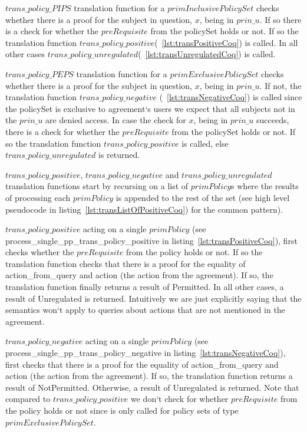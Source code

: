 $trans\_policy\_PIPS$ translation function for a $primInclusivePolicySet$ checks whether there is a proof for the subject in question, $x$, being in $prin\_u$. If so there is a check for whether the $preRequisite$ from the policySet holds or not. If so the translation function $trans\_policy\_positive$(~\ref{lst:transPositiveCoq}) is called. In all other cases $trans\_policy\_unregulated$(~\ref{lst:transUnregulatedCoq}) is called.

$trans\_policy\_PEPS$ translation function for a $primExclusivePolicySet$ checks whether there is a proof for the subject in question, $x$, being in $prin\_u$. If not, the translation function $trans\_policy\_negative$ (~\ref{lst:transNegativeCoq}) is called since the policySet is exclusive to agreement`s users we expect that all subjects not in the $prin\_u$ are denied access. In case the check for $x$, being in $prin\_u$ succeeds, there is a check for whether the $preRequisite$ from the policySet holds or not. If so the translation function $trans\_policy\_positive$ is called, else $trans\_policy\_unregulated$ is returned.

$trans\_policy\_positive$, $trans\_policy\_negative$ and $trans\_policy\_unregulated$ translation functions start by recursing on a list of $primPolicy$s where the results of processing each $primPolicy$ is appended to the rest of the set (see high level pseudocode in listing~\ref{lst:transListOfPositiveCoq}) for the common pattern). 

$trans\_policy\_positive$ acting on a single $primPolicy$ (see process_single_pp_trans_policy_positive in listing~\ref{lst:transPositiveCoq}), first checks whether the $preRequisite$ from the policy holds or not. If so the translation function checks that there is a proof for the equality of action_from_query and action (the action from the agreement). If so, the translation function finally returns a result of Permitted. In all other cases, a result of Unregulated is returned. Intuitively we are just explicitly saying that the semantics won`t apply to queries about actions that are not mentioned in the agreement.

$trans\_policy\_negative$ acting on a single $primPolicy$ (see process_single_pp_trans_policy_negative in listing~\ref{lst:transNegativeCoq}), first checks that there is a proof for the equality of action_from_query and action (the action from the agreement). If so, the translation function returns a result of NotPermitted. Otherwise, a result of Unregulated is returned. Note that compared to $trans\_policy\_positive$ we don`t check for whether $preRequisite$ from the policy holds or not since is only called for policy sets of type $primExclusivePolicySet$.

